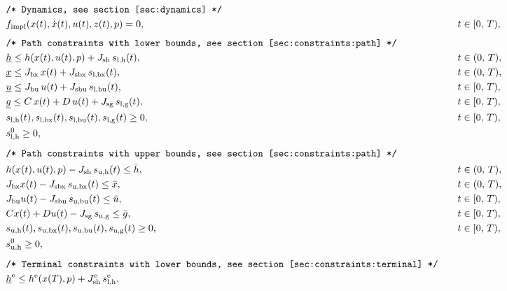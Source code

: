 \documentclass[english]{article}
\newcommand{\ind}[1]{_{\textrm{#1}}}
\newcommand{\terminal}{^{\textrm{e}}}
\newcommand{\initial}{^{\textrm{0}}}
\newcommand{\lowerh}{\ind{l,h}}
\newcommand{\lowerbx}{\ind{l,bx}}
\newcommand{\lowerbu}{\ind{l,bu}}
\newcommand{\lowerg}{\ind{l,g}}
\newcommand{\upperh}{\ind{u,h}}
\newcommand{\upperbx}{\ind{u,bx}}
\newcommand{\upperbu}{\ind{u,bu}}
\newcommand{\upperg}{\ind{u,g}}
\newcommand{\mathComment}[1]{\texttt{/* #1 */}}
\begin{document}
\begin{align}
    &&&\mathComment{Dynamics, see section \ref{sec:dynamics}}\nonumber\\
    &&& f\ind{impl}(x(t), \dot{x}(t), u(t), z(t),p ) = 0, &&\quad t \in [0,\,T), \label{eq:dynamics}\\[1ex]
    &&&\mathComment{Path constraints with lower bounds, see section \ref{sec:constraints:path}}\nonumber\\
    &&&\underline{h} \leq h(x(t), u(t), p) + J_{\textrm{sh}} \, s\lowerh(t), &&\quad t \in (0,\,T),\\
    &&&\underline{x} \leq J_{\textrm{bx}} \, x(t) + J_{\textrm{sbx}} \,s\lowerbx(t), &&\quad t \in (0,\,T),\\
    &&&\underline{u} \leq J_{\textrm{bu}} \,u(t) + J_{\textrm{sbu}} \,s\lowerbu(t), &&\quad t \in [0,\,T),\\
    &&&\underline{g} \leq C\,x(t) + D\,u(t) + J_{\textrm{sg}} \,s\lowerg(t), &&\quad t \in [0,\,T), \\
    &&& s\lowerh (t), s\lowerbx(t), s\lowerbu(t), s\lowerg(t) \geq 0, &&\quad t \in [0,\,T), \\
    &&& s\lowerh\initial \geq 0, && \label{eq:constraints:path:lower_bounds:end}\\[1ex]
    &&&\mathComment{Path constraints with upper bounds, see section \ref{sec:constraints:path}}\nonumber\\
    &&& h(x(t), u(t), p) - J_{\textrm{sh}} \, s\upperh(t) \leq \bar{h}, &&\quad t \in (0,\,T),\\
    &&& J_{\textrm{bx}} x(t) - J_{\textrm{sbx}}\, s\upperbx(t) \leq \bar{x}, &&\quad t \in (0,\,T),\\
    &&& J_{\textrm{bu}} u(t) - J_{\textrm{sbu}}\, s\upperbu(t)\leq \bar{u}, &&\quad t \in [0,\,T),\\
    &&& Cx(t) + Du(t) - J_{\textrm{sg}}\, s\upperg \leq \bar{g}, &&\quad t \in [0,\,T), \\
    &&& s\upperh(t), s\upperbx(t), s\upperbu(t), s\upperg(t) \geq 0, &&\quad t \in [0,\,T), \\
    &&& s\ind{u,h}\initial \geq 0, && \label{eq:constraints:path:upper_bounds:end}\\[1ex]
    &&&\mathComment{Terminal constraints with lower bounds, see section \ref{sec:constraints:terminal}}\nonumber\\
    &&&\underline{h}\terminal \leq h\terminal(x(T), p) + J\ind{sh}\terminal\, s\lowerh\terminal, &&\label{eq:constraints:terminal:lower_bounds:start}\\

\end{align}
\end{document}
